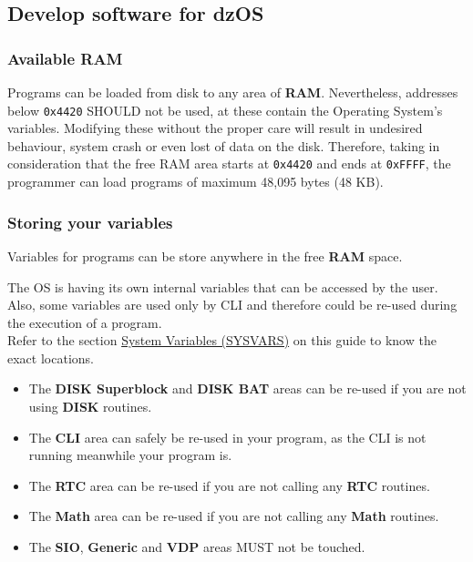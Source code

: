 \documentclass[a4paper,11pt]{article}
\begin{document}
    \subsection{Develop software for dzOS}

    \subsubsection{Available RAM}
    Programs can be loaded from disk to any area of \textbf{RAM}. Nevertheless,
    addresses below \texttt{0x4420} SHOULD not be used, at these contain the
    Operating System's variables. Modifying these without the proper care will
    result in undesired behaviour, system crash or even lost of data on the disk.
    Therefore, taking in consideration that the free RAM area starts at
    \texttt{0x4420} and ends at \texttt{0xFFFF}, the programmer can load
    programs of maximum 48,095 bytes (48 KB).

    \subsubsection{Storing your variables}
    Variables for programs can be store anywhere in the free \textbf{RAM} space.
    
    The OS is having its own internal variables that can be accessed by the user.
    Also, some variables are used only by CLI and therefore could be re-used
    during the execution of a program.\\

    Refer to the section \hyperref[sec:ram_memmap]{System Variables (SYSVARS)}
    on this guide to know the exact locations.

    \begin{itemize}
        \item The \textbf{DISK Superblock} and \textbf{DISK BAT} areas can be
        re-used if you are not using \textbf{DISK} routines.
        \item The \textbf{CLI} area can safely be re-used in your program, as
        the CLI is not running meanwhile your program is.
        \item The \textbf{RTC} area can be re-used if you are not calling any
        \textbf{RTC} routines.
        \item The \textbf{Math} area can be re-used if you are not calling any
        \textbf{Math} routines.
        \item The \textbf{SIO}, \textbf{Generic} and \textbf{VDP} areas MUST not
        be touched.
    \end{itemize}
\end{document}
